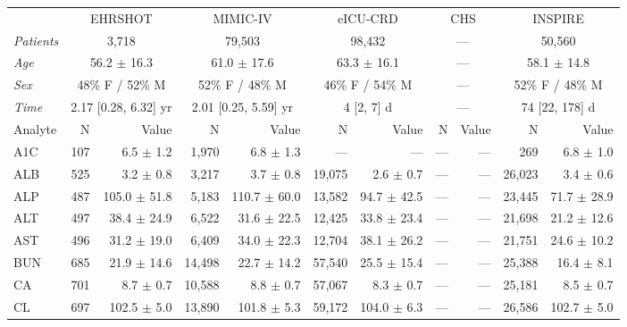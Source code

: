 \begin{table}[ht]
\centering
\scriptsize
\begin{tabular}{lrrrrrrrrrr}
\toprule
  & \multicolumn{2}{c}{EHRSHOT} & \multicolumn{2}{c}{MIMIC-IV} & \multicolumn{2}{c}{eICU-CRD} & \multicolumn{2}{c}{CHS} & \multicolumn{2}{c}{INSPIRE} \\
\cmidrule(lr){2-3} \cmidrule(lr){4-5} \cmidrule(lr){6-7} \cmidrule(lr){8-9} \cmidrule(lr){10-11}
\textit{Patients} & \multicolumn{2}{c}{3,718} & \multicolumn{2}{c}{79,503} & \multicolumn{2}{c}{98,432} & \multicolumn{2}{c}{---} & \multicolumn{2}{c}{50,560} \\
\textit{Age} & \multicolumn{2}{c}{56.2 $\pm$ 16.3} & \multicolumn{2}{c}{61.0 $\pm$ 17.6} & \multicolumn{2}{c}{63.3 $\pm$ 16.1} & \multicolumn{2}{c}{---} & \multicolumn{2}{c}{58.1 $\pm$ 14.8} \\
\textit{Sex} & \multicolumn{2}{c}{48\% F / 52\% M} & \multicolumn{2}{c}{52\% F / 48\% M} & \multicolumn{2}{c}{46\% F / 54\% M} & \multicolumn{2}{c}{---} & \multicolumn{2}{c}{52\% F / 48\% M} \\
\textit{Time} & \multicolumn{2}{c}{2.17 [0.28, 6.32] yr} & \multicolumn{2}{c}{2.01 [0.25, 5.59] yr} & \multicolumn{2}{c}{4 [2, 7] d} & \multicolumn{2}{c}{---} & \multicolumn{2}{c}{74 [22, 178] d} \\
\midrule
Analyte & N & Value & N & Value & N & Value & N & Value & N & Value \\
\midrule
A1C & 107 & 6.5 $\pm$ 1.2 & 1,970 & 6.8 $\pm$ 1.3 & --- & --- & --- & --- & 269 & 6.8 $\pm$ 1.0 \\
ALB & 525 & 3.2 $\pm$ 0.8 & 3,217 & 3.7 $\pm$ 0.8 & 19,075 & 2.6 $\pm$ 0.7 & --- & --- & 26,023 & 3.4 $\pm$ 0.6 \\
ALP & 487 & 105.0 $\pm$ 51.8 & 5,183 & 110.7 $\pm$ 60.0 & 13,582 & 94.7 $\pm$ 42.5 & --- & --- & 23,445 & 71.7 $\pm$ 28.9 \\
ALT & 497 & 38.4 $\pm$ 24.9 & 6,522 & 31.6 $\pm$ 22.5 & 12,425 & 33.8 $\pm$ 23.4 & --- & --- & 21,698 & 21.2 $\pm$ 12.6 \\
AST & 496 & 31.2 $\pm$ 19.0 & 6,409 & 34.0 $\pm$ 22.3 & 12,704 & 38.1 $\pm$ 26.2 & --- & --- & 21,751 & 24.6 $\pm$ 10.2 \\
BUN & 685 & 21.9 $\pm$ 14.6 & 14,498 & 22.7 $\pm$ 14.2 & 57,540 & 25.5 $\pm$ 15.4 & --- & --- & 25,388 & 16.4 $\pm$ 8.1 \\
CA & 701 & 8.7 $\pm$ 0.7 & 10,588 & 8.8 $\pm$ 0.7 & 57,067 & 8.3 $\pm$ 0.7 & --- & --- & 25,181 & 8.5 $\pm$ 0.7 \\
CL & 697 & 102.5 $\pm$ 5.0 & 13,890 & 101.8 $\pm$ 5.3 & 59,172 & 104.0 $\pm$ 6.3 & --- & --- & 26,586 & 102.7 $\pm$ 5.0 \\

\end{tabular}
\end{table}

